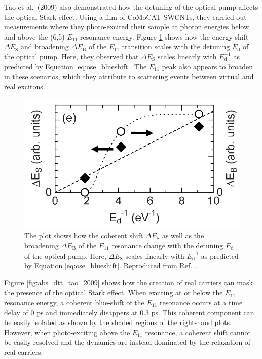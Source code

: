 Tao et al.\ (2009) also demonstrated how the detuning of the optical pump affects the optical Stark effect. Using a film of CoMoCAT SWCNTs, they carried out measurements where they photo-excited their sample at photon energies below and above the (6,5) $E_{11}$ resonance energy. Figure \ref{fig:detuning_tao_2009} shows how the energy shift $\Delta E_\text{S}$ and broadening $\Delta E_\text{B}$ of the $E_{11}$ transition scales with the detuning $E_\text{d}$ of the optical pump. Here, they observed that $\Delta E_\text{S}$ scales linearly with $E_\text{d}^{-1}$ as predicted by Equation \eqref{eq:ose_blueshift}. The $E_{11}$ peak also appears to broaden in these scenarios, which they attribute to scattering events between virtual and real excitons.

\begin{figure}[ht]
	\centering
	\includegraphics[scale=0.35]{images/chapter_prior_works/fluence_tao_2009}
	\caption{The plot shows how the coherent shift $\Delta E_\text{S}$ as well as the broadening $\Delta E_\text{B}$ of the $E_{11}$ resonance change with the detuning $E_\text{d}$ of the optical pump. Here, $\Delta E_\text{S}$ scales linearly with $E_\text{d}^{-1}$ as predicted by Equation \eqref{eq:ose_blueshift}. Reproduced from Ref.\ \cite{tao2009subpicosecond}.}
	\label{fig:detuning_tao_2009}
\end{figure}

Figure \ref{fig:abs_dtt_tao_2009} shows how the creation of real carriers can mask the presence of the optical Stark effect. When exciting at or below the $E_{11}$ resonance energy, a coherent blue-shift of the $E_{11}$ resonance occurs at a time delay of 0 ps and immediately disappers at 0.3 ps. This coherent component can be easily isolated as shown by the shaded regions of the right-hand plots. However, when photo-exciting above the $E_{11}$ resonance, a coherent shift cannot be easily resolved and the dynamics are instead dominated by the relaxation of real carriers.

